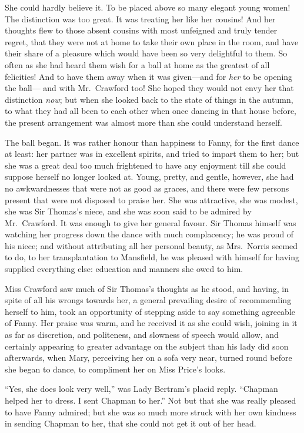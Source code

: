 \documentclass{article}
\begin{document}
She could hardly believe it.  To be placed above so many
elegant young women!  The distinction was too great.
It was treating her like her cousins!  And her thoughts
flew to those absent cousins with most unfeigned and truly
tender regret, that they were not at home to take their
own place in the room, and have their share of a pleasure
which would have been so very delightful to them.
So often as she had heard them wish for a ball at home
as the greatest of all felicities!  And to have them away
when it was given---and for \emph{her} to be opening the ball---%
and with Mr.\ Crawford too!  She hoped they would not envy
her that distinction \emph{now}; but when she looked back
to the state of things in the autumn, to what they had all
been to each other when once dancing in that house before,
the present arrangement was almost more than she could
understand herself.

The ball began.  It was rather honour than happiness
to Fanny, for the first dance at least:  her partner was
in excellent spirits, and tried to impart them to her;
but she was a great deal too much frightened to have
any enjoyment till she could suppose herself no longer
looked at.  Young, pretty, and gentle, however, she had
no awkwardnesses that were not as good as graces,
and there were few persons present that were not disposed
to praise her.  She was attractive, she was modest,
she was Sir Thomas's niece, and she was soon said
to be admired by Mr.\ Crawford.  It was enough to give
her general favour.  Sir Thomas himself was watching
her progress down the dance with much complacency;
he was proud of his niece; and without attributing
all her personal beauty, as Mrs.\ Norris seemed to do,
to her transplantation to Mansfield, he was pleased
with himself for having supplied everything else:
education and manners she owed to him.

Miss Crawford saw much of Sir Thomas's thoughts as he stood,
and having, in spite of all his wrongs towards her,
a general prevailing desire of recommending herself to him,
took an opportunity of stepping aside to say something
agreeable of Fanny.  Her praise was warm, and he received
it as she could wish, joining in it as far as discretion,
and politeness, and slowness of speech would allow,
and certainly appearing to greater advantage on the subject
than his lady did soon afterwards, when Mary, perceiving her
on a sofa very near, turned round before she began to dance,
to compliment her on Miss Price's looks.

``Yes, she does look very well,'' was Lady Bertram's placid reply.
``Chapman helped her to dress.  I sent Chapman to her.''
Not but that she was really pleased to have Fanny admired;
but she was so much more struck with her own kindness
in sending Chapman to her, that she could not get it out
of her head.
\end{document}
